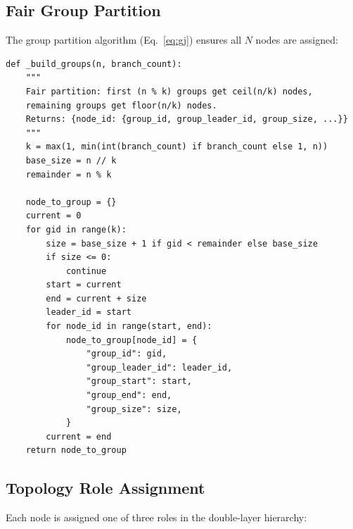 \documentclass[12pt,a4paper]{article}
\begin{document}
\subsection{Fair Group Partition}

The group partition algorithm (Eq.~\ref{eq:gj}) ensures all $N$ nodes are assigned:

\begin{lstlisting}[caption={Fair group partition (\texttt{topology\_manager.py})}, label=lst:groups]
def _build_groups(n, branch_count):
    """
    Fair partition: first (n % k) groups get ceil(n/k) nodes,
    remaining groups get floor(n/k) nodes.
    Returns: {node_id: {group_id, group_leader_id, group_size, ...}}
    """
    k = max(1, min(int(branch_count) if branch_count else 1, n))
    base_size = n // k
    remainder = n % k

    node_to_group = {}
    current = 0
    for gid in range(k):
        size = base_size + 1 if gid < remainder else base_size
        if size <= 0:
            continue
        start = current
        end = current + size
        leader_id = start
        for node_id in range(start, end):
            node_to_group[node_id] = {
                "group_id": gid,
                "group_leader_id": leader_id,
                "group_start": start,
                "group_end": end,
                "group_size": size,
            }
        current = end
    return node_to_group
\end{lstlisting}

\subsection{Topology Role Assignment}

Each node is assigned one of three roles in the double-layer hierarchy:
\end{document}

